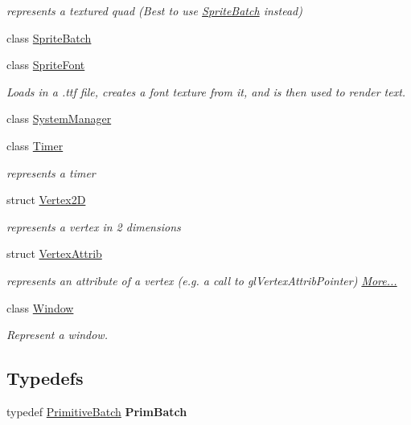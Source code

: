 \begin{DoxyCompactItemize}
\begin{DoxyCompactList}\small\item\em represents a textured quad (Best to use \hyperlink{classnta_1_1SpriteBatch}{Sprite\+Batch} instead) \end{DoxyCompactList}\item 
class \hyperlink{classnta_1_1SpriteBatch}{Sprite\+Batch}
\item 
class \hyperlink{classnta_1_1SpriteFont}{Sprite\+Font}
\begin{DoxyCompactList}\small\item\em Loads in a .ttf file, creates a font texture from it, and is then used to render text. \end{DoxyCompactList}\item 
class \hyperlink{classnta_1_1SystemManager}{System\+Manager}
\item 
class \hyperlink{classnta_1_1Timer}{Timer}
\begin{DoxyCompactList}\small\item\em represents a timer \end{DoxyCompactList}\item 
struct \hyperlink{structnta_1_1Vertex2D}{Vertex2D}
\begin{DoxyCompactList}\small\item\em represents a vertex in 2 dimensions \end{DoxyCompactList}\item 
struct \hyperlink{namespacenta_df/d9d/structnta_1_1VertexAttrib}{Vertex\+Attrib}
\begin{DoxyCompactList}\small\item\em represents an attribute of a vertex (e.\+g. a call to gl\+Vertex\+Attrib\+Pointer)  \hyperlink{namespacenta_df/d9d/structnta_1_1VertexAttrib}{More...}\end{DoxyCompactList}\item 
class \hyperlink{classnta_1_1Window}{Window}
\begin{DoxyCompactList}\small\item\em Represent a window. \end{DoxyCompactList}\end{DoxyCompactItemize}
\subsection*{Typedefs}
\begin{DoxyCompactItemize}
\item 
\mbox{\label{namespacenta_acee44e1bbf4f2431ec51a26e231691e5}} 
typedef \hyperlink{classnta_1_1PrimitiveBatch}{Primitive\+Batch} {\bfseries Prim\+Batch}
\end{DoxyCompactItemize}
